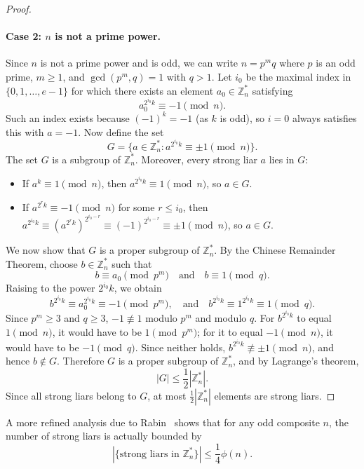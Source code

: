 \begin{proof}
    \paragraph{Case 2: \(n\) is not a prime power.}
    Since \(n\) is not a prime power and is odd, we can write \(n = p^m q\) where \(p\) is an odd prime, \(m \geq 1\), and \(\gcd(p^m, q) = 1\) with \(q > 1\).
    Let \(i_0\) be the maximal index in \(\{0, 1, \dots, e-1\}\) for which there exists an element \(a_0 \in \mathbb{Z}_n^*\) satisfying
    \[
        a_0^{2^{i_0} k} \equiv -1 \pmod{n}.
    \]
    Such an index exists because \((-1)^k = -1\) (as \(k\) is odd), so \(i = 0\) always satisfies this with \(a = -1\).
    Now define the set
    \[
        G = \{a \in \mathbb{Z}_n^* : a^{2^{i_0} k} \equiv \pm 1 \pmod{n}\}.
    \]
    The set \(G\) is a subgroup of \(\mathbb{Z}_n^*\).
    Moreover, every strong liar \(a\) lies in \(G\):
    \begin{itemize}
        \item If \(a^k \equiv 1 \pmod{n}\), then \(a^{2^{i_0} k} \equiv 1 \pmod{n}\), so \(a \in G\).
        \item If \(a^{2^r k} \equiv -1 \pmod{n}\) for some \(r \leq i_0\), then \(a^{2^{i_0} k} \equiv (a^{2^r k})^{2^{i_0 - r}} \equiv (-1)^{2^{i_0 - r}} \equiv \pm 1 \pmod{n}\), so \(a \in G\).
    \end{itemize}
    We now show that \(G\) is a proper subgroup of \(\mathbb{Z}_n^*\).
    By the Chinese Remainder Theorem, choose \(b \in \mathbb{Z}_n^*\) such that
    \[
        b \equiv a_0 \pmod{p^m} \quad \text{and} \quad b \equiv 1 \pmod{q}.
    \]
    Raising to the power \(2^{i_0} k\), we obtain
    \[
        b^{2^{i_0} k} \equiv a_0^{2^{i_0} k} \equiv -1 \pmod{p^m}, \quad \text{and} \quad b^{2^{i_0} k} \equiv 1^{2^{i_0} k} \equiv 1 \pmod{q}.
    \]
    Since \(p^m \geq 3\) and \(q \geq 3\), \(-1 \not\equiv 1\) modulo \(p^m\) and modulo \(q\).
    For \(b^{2^{i_0} k}\) to equal \(1 \pmod{n}\), it would have to be \(1 \pmod{p^m}\); for it to equal \(-1 \pmod{n}\), it would have to be \(-1 \pmod{q}\).
    Since neither holds, \(b^{2^{i_0} k} \not\equiv \pm 1 \pmod{n}\), and hence \(b \notin G\).
    Therefore \(G\) is a proper subgroup of \(\mathbb{Z}_n^*\), and by Lagrange's theorem,
    \[
        |G| \leq \frac{1}{2} |\mathbb{Z}_n^*|.
    \]
    Since all strong liars belong to \(G\), at most \(\frac{1}{2}|\mathbb{Z}_n^*|\) elements are strong liars.
\end{proof}

\begin{remark}
    A more refined analysis due to Rabin~\cite{Rabin1980} shows that for any odd composite \(n\), the number of strong liars is actually bounded by
    \[
        |\{\text{strong liars in } \mathbb{Z}_n^*\}| \leq \frac{1}{4} \phi(n).
    \]
\end{remark}

